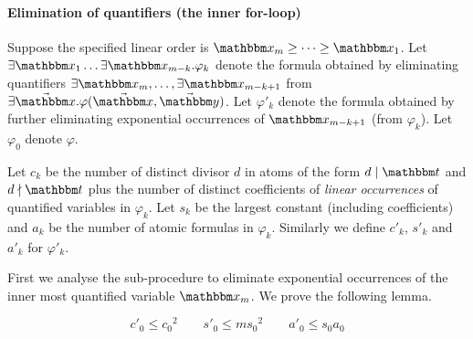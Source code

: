 \paragraph{Elimination of quantifiers (the inner for-loop)}
Suppose the specified linear order is $\ivarx_m\ge \dots \ge \ivarx_1$. Let $\exists \ivarx_1\dots \exists\ivarx_{m-k}.\varphi_k$ denote the formula obtained by eliminating quantifiers $\exists \ivarx_m,\dots,\exists\ivarx_{m-k+1}$ from $\exists \vec{\ivarx}. \varphi(\vec{\ivarx},\vec{\ivary})$. Let $\varphi'_k$ denote the formula obtained by further eliminating exponential occurrences of $\ivarx_{m-k+1}$ (from $\varphi_k$). Let $\varphi_0$ denote $\varphi$.

Let $c_k$ be the number of distinct divisor $d$ in atoms of the form $d \mid \iterm$ and $d \nmid \iterm$ plus the number of distinct coefficients of \emph{linear occurrences} of quantified variables in $\varphi_k$. Let $s_k$ be the largest constant (including coefficients) and $a_k$ be the number of atomic formulas in $\varphi_k$. Similarly we define $c'_k$, $s'_k$ and $a'_k$ for $\varphi'_k$.

First we analyse the sub-procedure to eliminate exponential occurrences of the inner most quantified variable $\ivarx_m$. We prove the following lemma.

\begin{lemma}\label{lem:cpx exp}
$$c'_0\le {c_0}^2 \qquad s'_0\le m{s_0}^2 \qquad a'_0\le s_0a_0$$ 
\end{lemma}


